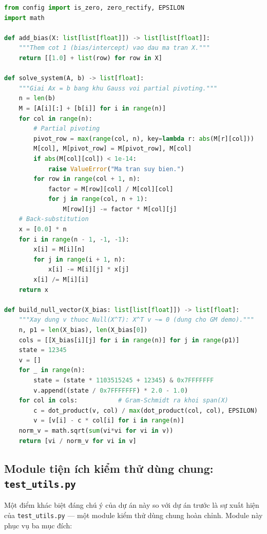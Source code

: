 \begin{lstlisting}[language=Python, caption={Trích đoạn \texttt{utils.py}: các hàm cốt lõi cho OLS}]
from config import is_zero, zero_rectify, EPSILON
import math

def add_bias(X: list[list[float]]) -> list[list[float]]:
    """Them cot 1 (bias/intercept) vao dau ma tran X."""
    return [[1.0] + list(row) for row in X]

def solve_system(A, b) -> list[float]:
    """Giai Ax = b bang khu Gauss voi partial pivoting."""
    n = len(b)
    M = [A[i][:] + [b[i]] for i in range(n)]
    for col in range(n):
        # Partial pivoting
        pivot_row = max(range(col, n), key=lambda r: abs(M[r][col]))
        M[col], M[pivot_row] = M[pivot_row], M[col]
        if abs(M[col][col]) < 1e-14:
            raise ValueError("Ma tran suy bien.")
        for row in range(col + 1, n):
            factor = M[row][col] / M[col][col]
            for j in range(col, n + 1):
                M[row][j] -= factor * M[col][j]
    # Back-substitution
    x = [0.0] * n
    for i in range(n - 1, -1, -1):
        x[i] = M[i][n]
        for j in range(i + 1, n):
            x[i] -= M[i][j] * x[j]
        x[i] /= M[i][i]
    return x

def build_null_vector(X_bias: list[list[float]]) -> list[float]:
    """Xay dung v thuoc Null(X^T): X^T v ~= 0 (dung cho GM demo)."""
    n, p1 = len(X_bias), len(X_bias[0])
    cols = [[X_bias[i][j] for i in range(n)] for j in range(p1)]
    state = 12345
    v = []
    for _ in range(n):
        state = (state * 1103515245 + 12345) & 0x7FFFFFFF
        v.append((state / 0x7FFFFFFF) * 2.0 - 1.0)
    for col in cols:           # Gram-Schmidt ra khoi span(X)
        c = dot_product(v, col) / max(dot_product(col, col), EPSILON)
        v = [v[i] - c * col[i] for i in range(n)]
    norm_v = math.sqrt(sum(vi*vi for vi in v))
    return [vi / norm_v for vi in v]
\end{lstlisting}

\subsection{Module tiện ích kiểm thử dùng chung: \texttt{test\_utils.py}}

Một điểm khác biệt đáng chú ý của dự án này so với dự án trước là sự xuất hiện của \texttt{test\_utils.py} --- một module kiểm thử dùng chung hoàn chỉnh. Module này phục vụ ba mục đích:

